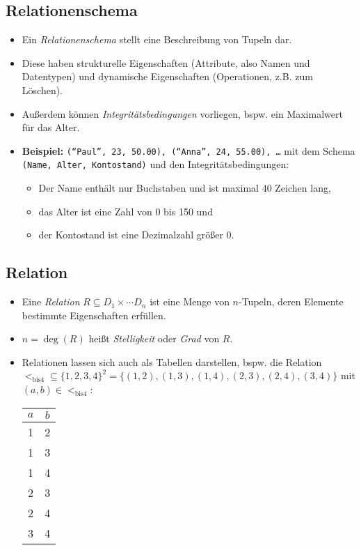 		\subsection{Relationenschema} %
			\begin{itemize}
				\item Ein \textit{Relationenschema} stellt eine Beschreibung von Tupeln dar.
				\item Diese haben strukturelle Eigenschaften (Attribute, also Namen und Datentypen) und dynamische Eigenschaften (Operationen, z.B. zum Löschen).
				\item Außerdem können \textit{Integritätsbedingungen} vorliegen, bspw. ein Maximalwert für das Alter.
				\item \textbf{Beispiel:} \texttt{(\enquote{Paul}, 23, 50.00), (\enquote{Anna}, 24, 55.00), \dots} mit dem Schema \texttt{(Name, Alter, Kontostand)} und den Integritätsbedingungen:
					\begin{itemize}
						\item Der Name enthält nur Buchstaben und ist maximal 40 Zeichen lang,
						\item das Alter ist eine Zahl von 0 bis 150 und
						\item der Kontostand ist eine Dezimalzahl größer 0.
					\end{itemize}
			\end{itemize}

		\subsection{Relation} %
			\begin{itemize}
				\item Eine \textit{Relation} \( R \subseteq D _ 1 \times \cdots D _ n \) ist eine Menge von \(n\)-Tupeln, deren Elemente bestimmte Eigenschaften erfüllen.
				\item \( n = \deg(R) \) heißt \textit{Stelligkeit} oder \textit{Grad} von \(R\).
				\item Relationen lassen sich auch als Tabellen darstellen, bspw. die Relation \\ \( < _ \text{bis4} \subseteq \{ 1, 2, 3, 4 \} ^ 2 = \{ (1, 2), (1, 3), (1, 4), (2, 3), (2, 4), (3, 4) \} \) mit \( (a, b) \in < _ \text{bis4} \):
					\begin{table}[H]
						\centering
						\begin{tabular}{c | c}
							\(a\) & \(b\) \\ \hline
							1     & 2     \\
							1     & 3     \\
							1     & 4     \\
							2     & 3     \\
							2     & 4     \\
							3     & 4
						\end{tabular}
					\end{table}
			\end{itemize}

